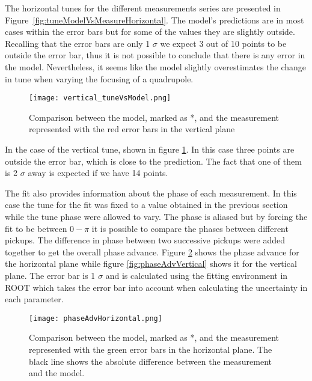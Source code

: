 The horizontal tunes for the different measurements series are presented in 
Figure~\ref{fig:tuneModelVsMeasureHorizontal}. 
The model's predictions are in most cases within the error bars 
but for some of the values they are slightly outside. 
Recalling that the error bars are only 1 $\sigma$ we expect 
3 out of 10 points to be outside the error bar, 
thus it is not possible to conclude that there is any error in the model. 
Nevertheless, it seems like the model slightly overestimates 
the change in tune when varying the focusing of a quadrupole.
 
\begin{figure}[!h]
\centering
\texttt{[image: vertical\_tuneVsModel.png]}
\caption[Comparison between the tune from the model and the measurement in the vertical plane]
{Comparison between the model, marked as *, and the measurement represented with 
the red error bars in the vertical plane \label{fig:tuneModelVsMeasureVertical}}
\end{figure}
In the case of the vertical tune, shown in figure \ref{fig:tuneModelVsMeasureVertical}. 
In this case three points are outside the error bar, which is close to the prediction. 
The fact that one of them is 2 $\sigma$ away is expected if we have 14 points.


The fit also provides information about the phase of each measurement. 
In this case the tune for the fit was fixed to a value obtained in the previous section 
while the tune phase were allowed to vary. 
The phase is aliased but by forcing the fit to be between $0 - \pi$ 
it is possible to compare the phases between different pickups. 
The difference in phase between two successive pickups were added together 
to get the overall phase advance. 
Figure \ref{fig:phaseAdvHorizontal} shows the phase advance for 
the horizontal plane while figure \ref{fig:phaseAdvVertical} shows it 
for the vertical plane. The error bar is 1 $\sigma$ and 
is calculated using the fitting environment in ROOT which takes the error bar into account
when calculating the uncertainty in each parameter.
 
\begin{figure}[!h]
\centering
\texttt{[image: phaseAdvHorizontal.png]}
\caption[Phase advance in the horizontal plane]
{Comparison between the model, marked as *, 
and the measurement represented with the green error bars in the horizontal plane. 
The black line shows the absolute difference between the measurement 
and the model. \label{fig:phaseAdvHorizontal}}
\end{figure}
 
